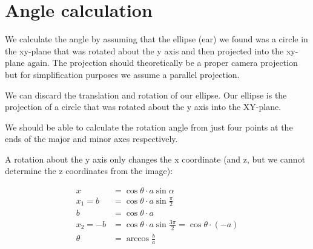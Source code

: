 \documentclass[english]{article}
\begin{document}
\section{Angle calculation}
We calculate the angle by assuming that the ellipse (ear) we found was a circle
in the xy-plane that was rotated about the y axis and then projected into the
xy-plane again. The projection should theoretically be a proper camera
projection but for simplification purposes we assume a parallel projection.

We can discard the translation and rotation of our ellipse. Our ellipse is the
projection of a circle that was rotated about the y axis into the XY-plane.

We should be able to calculate the rotation angle from just four points at the
ends of the major and minor axes respectively.

A rotation about the y axis only changes the x coordinate (and z, but we cannot
determine the z coordinates from the image):

\begin{align*}
  x &= \cos{\theta} \cdot a \sin{\alpha} \\
  x_{1} = b &= \cos{\theta} \cdot a \sin{\frac{\pi}{2}} \\
  b &= \cos{\theta} \cdot a \\
  x_{2} = -b &= \cos{\theta} \cdot a \sin{\frac{3 \pi}{2}} = \cos{\theta} \cdot (-a) \\
  \theta &= \arccos{\frac{b}{a}}
\end{align*}
\end{document}
